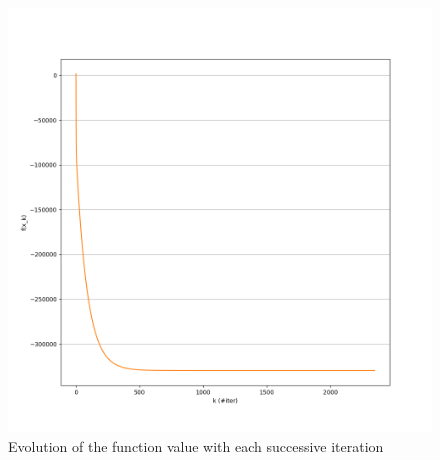 \documentclass[11pt]{article}
\begin{document}
\begin{figure}[!htbp]
    \includegraphics[width=\textwidth]{./function_value.png}
    \caption{Evolution of the function value with each successive iteration\label{fig:fv}}
\end{figure}
\end{document}
